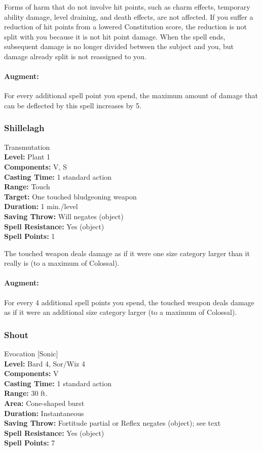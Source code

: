 Forms of harm that do not involve hit points, such as charm effects, temporary ability damage, level draining, and death effects, are not affected.
If you suffer a reduction of hit points from a lowered Constitution score, the reduction is not split with you because it is not hit point damage. 
When the spell ends, subsequent damage is no longer divided between the subject and you, but damage already split is not reassigned to you.

\paragraph{Augment:} For every additional spell point you spend, the maximum amount of damage that can be deflected by this spell increases by 5.
\subsubsection{Shillelagh}
\label{Spell:Shillelagh}
Transmutation
\\ \textbf{Level:} Plant 1
\\ \textbf{Components:} V, S
\\ \textbf{Casting Time:} 1 standard action
\\ \textbf{Range:} Touch
\\ \textbf{Target:} One touched bludgeoning weapon
\\ \textbf{Duration:} 1 min./level
\\ \textbf{Saving Throw:} Will negates (object)
\\ \textbf{Spell Resistance:} Yes (object)
\\ \textbf{Spell Points:} 1

The touched weapon deals damage as if it were one size category larger than it really is (to a maximum of Colossal).

\paragraph{Augment:} For every 4 additional spell points you spend, the touched weapon deals damage as if it were an additional size category larger (to a maximum of Colossal).
\subsubsection{Shout}
\label{Spell:Shout}
Evocation [Sonic]
\\ \textbf{Level:} Bard 4, Sor/Wiz 4
\\ \textbf{Components:} V
\\ \textbf{Casting Time:} 1 standard action
\\ \textbf{Range:} 30 ft.
\\ \textbf{Area:} Cone-shaped burst
\\ \textbf{Duration:} Instantaneous
\\ \textbf{Saving Throw:} Fortitude partial or Reflex negates (object); see text
\\ \textbf{Spell Resistance:} Yes (object)
\\ \textbf{Spell Points:} 7

